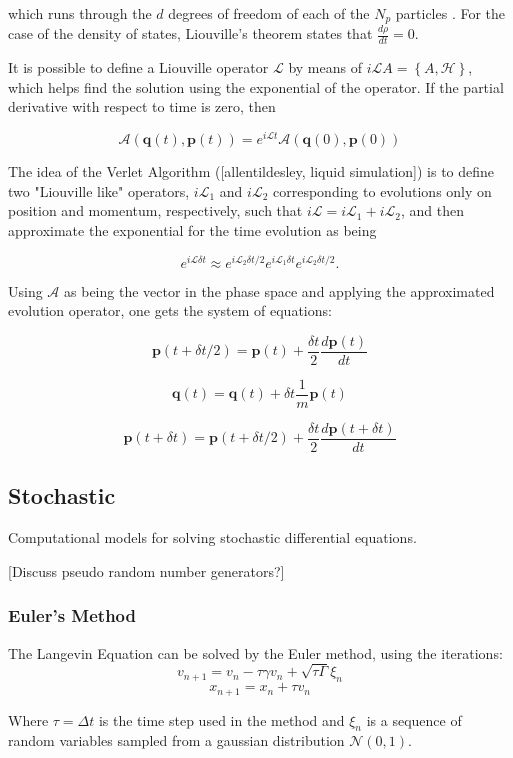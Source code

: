 which runs through the $d$ degrees of freedom of each of the $N_p$ particles \cite{salinasIntroducaoFisica2013}. For the case of the density of states, Liouville's theorem states that $\frac{d \rho}{dt} = 0$.

It is possible to define a Liouville operator $\mathcal{L}$ by means of $i\mathcal{L}A = \left\{A,\mathcal{H}\right\}$, which helps find the solution using the exponential of the operator. If the partial derivative with respect to time is zero, then

$$\mathcal{A}(\mathbf{q}(t), \mathbf{p}(t)) = e^{i\mathcal{L}t} \mathcal{A}(\mathbf{q}(0), \mathbf{p}(0))$$

The idea of the Verlet Algorithm ([allentildesley, liquid simulation]) is to define two "Liouville like" operators, $i\mathcal{L}_1$ and $i\mathcal{L}_2$ corresponding to evolutions only on position and momentum, respectively, such that $i\mathcal{L} = i\mathcal{L}_1 + i\mathcal{L}_2$, and then approximate the exponential for the time evolution as being

$$e^{i\mathcal{L}\delta t} \approx e^{i\mathcal{L}_2\delta t/2}e^{i\mathcal{L}_1\delta t}e^{i\mathcal{L}_2\delta t/2} .$$

Using $\mathcal{A}$ as being the vector in the phase space and applying the approximated evolution operator, one gets the system of equations:

$$\mathbf{p}(t+\delta t/2) = \mathbf{p}(t) + \frac{\delta t}{2}\frac{d \mathbf{p}(t)}{dt}$$

$$\mathbf{q}(t) = \mathbf{q}(t) + \delta t \frac{1}{m}\mathbf{p}(t)  $$

$$\mathbf{p}(t+\delta t) = \mathbf{p}(t+\delta t/2) + \frac{\delta t}{2}\frac{d \mathbf{p}(t+\delta t)}{dt}$$

\subsection{Stochastic}

Computational models for solving stochastic differential equations.

[Discuss pseudo random number generators?]

\subsubsection{Euler's Method} 

The Langevin Equation can be solved by the Euler method, using the iterations:
$$ v_{n+1} = v_{n} - \tau \gamma v_{n} + \sqrt{\tau\Gamma}\xi_{n} $$
$$ x_{n+1} = x_{n} + \tau v_{n}$$

Where $\tau = \Delta t$ is the time step used in the method and $\xi_{n}$ is a sequence of random variables sampled from a gaussian distribution $\mathcal{N}(0,1)$. 

